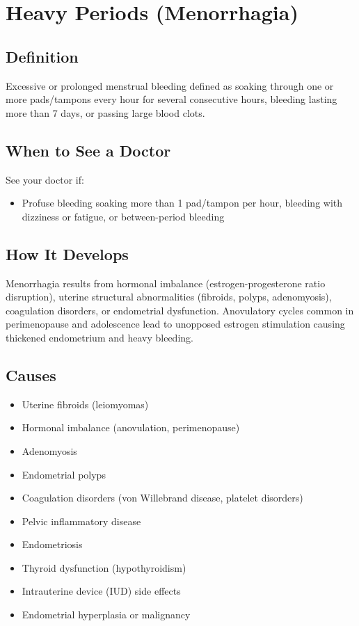 \chapter{Heavy Periods (Menorrhagia)}

\section*{Definition}
Excessive or prolonged menstrual bleeding defined as soaking through one or more pads/tampons every hour for several consecutive hours, bleeding lasting more than 7 days, or passing large blood clots.

\section*{When to See a Doctor}
See your doctor if:
\begin{itemize}
  \item Profuse bleeding soaking more than 1 pad/tampon per hour, bleeding with dizziness or fatigue, or between-period bleeding
\end{itemize}

\section*{How It Develops}
Menorrhagia results from hormonal imbalance (estrogen-progesterone ratio disruption), uterine structural abnormalities (fibroids, polyps, adenomyosis), coagulation disorders, or endometrial dysfunction. Anovulatory cycles common in perimenopause and adolescence lead to unopposed estrogen stimulation causing thickened endometrium and heavy bleeding.

\section*{Causes}
\begin{itemize}
  \item Uterine fibroids (leiomyomas)
  \item Hormonal imbalance (anovulation, perimenopause)
  \item Adenomyosis
  \item Endometrial polyps
  \item Coagulation disorders (von Willebrand disease, platelet disorders)
  \item Pelvic inflammatory disease
  \item Endometriosis
  \item Thyroid dysfunction (hypothyroidism)
  \item Intrauterine device (IUD) side effects
  \item Endometrial hyperplasia or malignancy
\end{itemize}


